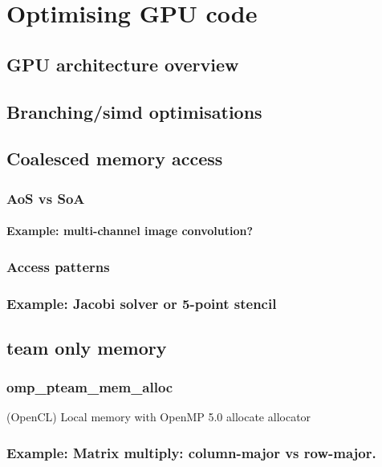 
%
%
\chapter{Optimising GPU code}

\section{GPU architecture overview}

%
%

\section{Branching/simd optimisations}

\section{Coalesced memory access}
\subsection{AoS vs SoA}
\subsubsection{Example: multi-channel image convolution?}

\subsection{Access patterns}
\subsection{Example: Jacobi solver or 5-point stencil}

\section{team only memory}
\subsection{omp\_pteam\_mem\_alloc}
(OpenCL) Local memory with OpenMP 5.0 allocate allocator
\subsection{Example: Matrix multiply: column-major vs row-major.}
